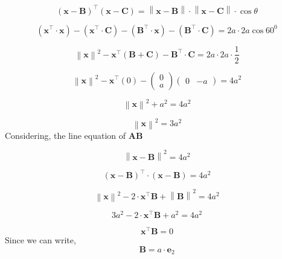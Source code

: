 \documentclass[journal,12pt,twocolumn]{IEEEtran}
\providecommand{\norm}[1]{\left\lVert#1\right\rVert}
\let\vec\mathbf
\newcommand{\myvec}[1]{\ensuremath{\begin{pmatrix}#1\end{pmatrix}}}
\providecommand{\brak}[1]{\ensuremath{\left(#1\right)}}
\begin{document}
 \begin{equation}  
  \brak{\vec{x}-\vec{B}}^{\top} \brak{\vec{x}-\vec{C}}= \norm{\vec{x}-\vec{B}} \cdot \norm{\vec{x}-\vec{C}} \cdot \cos\theta 
 \end{equation}

 \begin{equation}  
\brak{\vec{x}^\top \cdot \vec{x}} - \brak{\vec{x}^\top \cdot \vec{C}} - \brak{\vec{B}^\top \cdot \vec{x}} - \brak{\vec{B}^\top \cdot \vec{C}} = 2a \cdot 2a \cos 60^0   
 \end{equation}

 \begin{equation}  
\norm{\vec{x}}^2 - \vec{x}^\top\brak{\vec{B}+\vec{C}} - \vec{B}^\top \cdot \vec{C} = 2a \cdot 2a \cdot \frac{1}{2}
 \end{equation}

  \begin{equation}  
\norm{\vec{x}}^2 - \vec{x}^\top\brak{0} -\myvec{0 \\ a} \myvec{0 & -a}  = 4a^2
 \end{equation}

\begin{equation}
\norm{\vec{x}}^2 + a^2 = 4a^2
\end{equation}

\begin{equation}
\norm{\vec{x}}^2 = 3a^2
\label{eq-1}
\end{equation}
Considering, the line equation of $\vec{AB}$

\begin{equation}
\norm{\vec{x}-\vec{B}}^2 = 4a^2
\end{equation}

\begin{equation}
\brak{\vec{x} -\vec{B}}^{\top} \cdot \brak{\vec{x}-\vec{B}} = 4a^2
\end{equation}

\begin{equation}
\norm{\vec{x}}^2-2\cdot \vec{x}^\top \vec{B} + \norm{\vec{B}}^2 = 4a^2
\end{equation}

\begin{equation}
3a^2 - 2\cdot \vec{x}^\top \vec{B} + a^2 = 4a^2
\end{equation}

\begin{equation}
\vec{x}^\top \vec{B} = 0
\end{equation}
\noindent Since we can write, \begin{equation}
\vec{B} = a \cdot \vec{e}_2
\end{equation}
\end{document}
